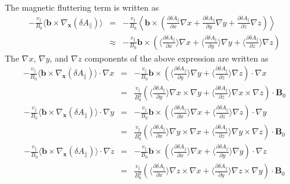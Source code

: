 \documentclass{llncs}
\begin{document}
The magnetic fluttering term is written as
\begin{eqnarray*}
  - \frac{v_{\parallel}}{B_0} \langle \mathbf{b} \times \nabla_{\mathbf{x}}
  (\delta A_{\parallel}) \rangle & = & - \frac{v_{\parallel}}{B_0}
  \left\langle \mathbf{b} \times \left( \frac{\partial \delta
  A_{\parallel}}{\partial x} \nabla x + \frac{\partial \delta
  A_{\parallel}}{\partial y} \nabla y + \frac{\partial \delta
  A_{\parallel}}{\partial z} \nabla z \right) \right\rangle\\
  & \approx & - \frac{v_{\parallel}}{B_0} \mathbf{b} \times \left( \langle
  \frac{\partial \delta A_{\parallel}}{\partial x} \rangle \nabla x + \langle
  \frac{\partial \delta A_{\parallel}}{\partial y} \rangle \nabla y + \langle
  \frac{\partial \delta A_{\parallel}}{\partial z} \rangle \nabla z \right)
\end{eqnarray*}
The $\nabla x$, $\nabla y$, and $\nabla z$ components of the above expression
are written as
\begin{eqnarray}
  - \frac{v_{\parallel}}{B_0} \langle \mathbf{b} \times \nabla_{\mathbf{x}}
  (\delta A_{\parallel}) \rangle \cdot \nabla x & = & -
  \frac{v_{\parallel}}{B_0} \mathbf{b} \times \left( \langle \frac{\partial
  \delta A_{\parallel}}{\partial y} \rangle \nabla y + \langle \frac{\partial
  \delta A_{\parallel}}{\partial z} \rangle \nabla z \right) \cdot \nabla x
  \nonumber\\
  & = & \frac{v_{\parallel}}{B_0^2} \left( \langle \frac{\partial \delta
  A_{\parallel}}{\partial y} \rangle \nabla x \times \nabla y + \langle
  \frac{\partial \delta A_{\parallel}}{\partial z} \rangle \nabla x \times
  \nabla z \right) \cdot \mathbf{B}_0 
\end{eqnarray}
\begin{eqnarray}
  - \frac{v_{\parallel}}{B_0} \langle \mathbf{b} \times \nabla_{\mathbf{x}}
  (\delta A_{\parallel}) \rangle \cdot \nabla y & = & -
  \frac{v_{\parallel}}{B_0} \mathbf{b} \times \left( \langle \frac{\partial
  \delta A_{\parallel}}{\partial x} \rangle \nabla x + \langle \frac{\partial
  \delta A_{\parallel}}{\partial z} \rangle \nabla z \right) \cdot \nabla y
  \nonumber\\
  & = & \frac{v_{\parallel}}{B_0^2} \left( \langle \frac{\partial \delta
  A_{\parallel}}{\partial x} \rangle \nabla y \times \nabla x + \langle
  \frac{\partial \delta A_{\parallel}}{\partial z} \rangle \nabla y \times
  \nabla z \right) \cdot \mathbf{B}_0 
\end{eqnarray}
\begin{eqnarray}
  - \frac{v_{\parallel}}{B_0} \langle \mathbf{b} \times \nabla_{\mathbf{x}}
  (\delta A_{\parallel}) \rangle \cdot \nabla z & = & -
  \frac{v_{\parallel}}{B_0} \mathbf{b} \times \left( \langle \frac{\partial
  \delta A_{\parallel}}{\partial x} \rangle \nabla x + \langle \frac{\partial
  \delta A_{\parallel}}{\partial y} \rangle \nabla y \right) \cdot \nabla z
  \nonumber\\
  & = & \frac{v_{\parallel}}{B_0^2} \left( \langle \frac{\partial \delta
  A_{\parallel}}{\partial x} \rangle \nabla z \times \nabla x + \langle
  \frac{\partial \delta A_{\parallel}}{\partial y} \rangle \nabla z \times
  \nabla y \right) \cdot \mathbf{B}_0 
\end{eqnarray}
\end{document}

